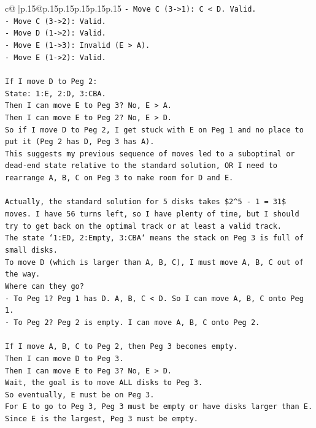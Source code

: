 \documentclass{article}
\begin{document}
{\begin{supertabular}{c@{$\;$}|p{.15\linewidth}@{}p{.15\linewidth}p{.15\linewidth}p{.15\linewidth}p{.15\linewidth}p{.15\linewidth}}
{{{\texttt{{-} Move C (3{-}>1): C < D. Valid.} \\
\texttt{{-} Move C (3{-}>2): Valid.} \\
\texttt{{-} Move D (1{-}>2): Valid.} \\
\texttt{{-} Move E (1{-}>3): Invalid (E > A).} \\
\texttt{{-} Move E (1{-}>2): Valid.} \\
\\ 
\texttt{If I move D to Peg 2:} \\
\texttt{State: 1:E, 2:D, 3:CBA.} \\
\texttt{Then I can move E to Peg 3? No, E > A.} \\
\texttt{Then I can move E to Peg 2? No, E > D.} \\
\texttt{So if I move D to Peg 2, I get stuck with E on Peg 1 and no place to put it (Peg 2 has D, Peg 3 has A).} \\
\texttt{This suggests my previous sequence of moves led to a suboptimal or dead{-}end state relative to the standard solution, OR I need to rearrange A, B, C on Peg 3 to make room for D and E.} \\
\\ 
\texttt{Actually, the standard solution for 5 disks takes \$2\^{}5 {-} 1 = 31\$ moves. I have 56 turns left, so I have plenty of time, but I should try to get back on the optimal track or at least a valid track.} \\
\texttt{The state `1:ED, 2:Empty, 3:CBA` means the stack on Peg 3 is full of small disks.} \\
\texttt{To move D (which is larger than A, B, C), I must move A, B, C out of the way.} \\
\texttt{Where can they go?} \\
\texttt{{-} To Peg 1? Peg 1 has D. A, B, C < D. So I can move A, B, C onto Peg 1.} \\
\texttt{{-} To Peg 2? Peg 2 is empty. I can move A, B, C onto Peg 2.} \\
\\ 
\texttt{If I move A, B, C to Peg 2, then Peg 3 becomes empty.} \\
\texttt{Then I can move D to Peg 3.} \\
\texttt{Then I can move E to Peg 3? No, E > D.} \\
\texttt{Wait, the goal is to move ALL disks to Peg 3.} \\
\texttt{So eventually, E must be on Peg 3.} \\
\texttt{For E to go to Peg 3, Peg 3 must be empty or have disks larger than E. Since E is the largest, Peg 3 must be empty.} \\
}}}
\end{supertabular}}
\end{document}
